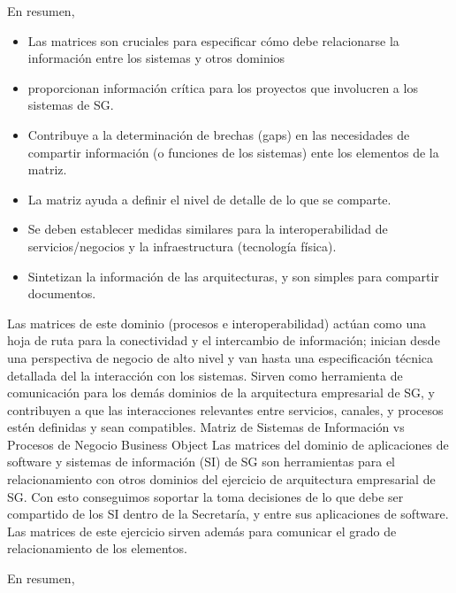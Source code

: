 \documentclass[
	a4paper, %
	12pt, %
]{include/CSSullivanBusinessReport}
\def\tightlist{}
\begin{document}
En resumen,

\begin{itemize}
\tightlist
\item
  Las matrices son cruciales para especificar cómo debe relacionarse la
  información entre los sistemas y otros dominios
\item
  proporcionan información crítica para los proyectos que involucren a
  los sistemas de SG.
\item
  Contribuye a la determinación de brechas (gaps) en las necesidades de
  compartir información (o funciones de los sistemas) ente los elementos
  de la matriz.
\item
  La matriz ayuda a definir el nivel de detalle de lo que se comparte.
\item
  Se deben establecer medidas similares para la interoperabilidad de
  servicios/negocios y la infraestructura (tecnología física).
\item
  Sintetizan la información de las arquitecturas, y son simples para
  compartir documentos.
\end{itemize}

Las matrices de este dominio (procesos e interoperabilidad) actúan como
una hoja de ruta para la conectividad y el intercambio de información;
inician desde una perspectiva de negocio de alto nivel y van hasta una
especificación técnica detallada del la interacción con los sistemas.
Sirven como herramienta de comunicación para los demás dominios de la
arquitectura empresarial de SG, y contribuyen a que las interacciones
relevantes entre servicios, canales, y procesos estén definidas y sean
compatibles. \textbar{} \textbar{} Matriz de Sistemas de Información vs
Procesos de Negocio \textbar{} Business Object \textbar{} Las matrices
del dominio de aplicaciones de software y sistemas de información (SI)
de SG son herramientas para el relacionamiento con otros dominios del
ejercicio de arquitectura empresarial de SG. Con esto conseguimos
soportar la toma decisiones de lo que debe ser compartido de los SI
dentro de la Secretaría, y entre sus aplicaciones de software. Las
matrices de este ejercicio sirven además para comunicar el grado de
relacionamiento de los elementos.

En resumen,
\end{document}
